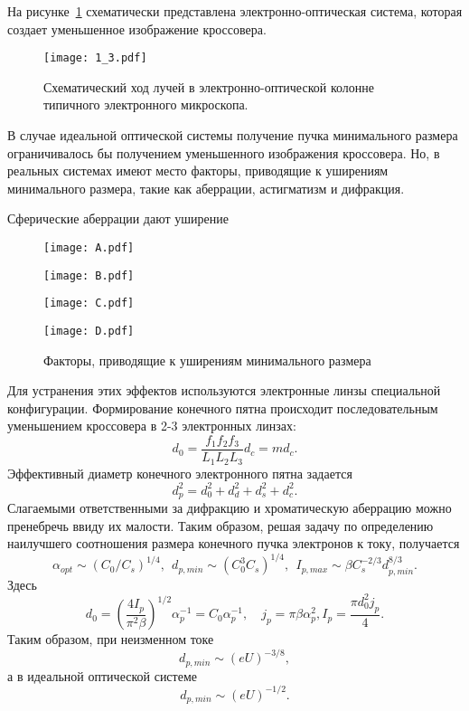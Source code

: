 На рисунке~\ref{fig:3} схематически представлена электронно-оптическая система, которая создает уменьшенное изображение кроссовера.
\begin{figure}[H]
\center
\texttt{[image: 1\_3.pdf]}
\caption{Схематический ход лучей в электронно-оптической колонне типичного электронного микроскопа.}
\label{fig:3}
\end{figure}

В случае идеальной оптической системы получение пучка минимального размера ограничивалось бы получением уменьшенного изображения кроссовера. Но, в реальных системах имеют место факторы, приводящие к уширениям минимального размера, такие как аберрации, астигматизм и дифракция.

Сферические аберрации дают уширение

\begin{figure}
    \center
    \texttt{[image: A.pdf]}
    \parbox[t]{.95\textwidth}{}
    \texttt{[image: B.pdf]}
    \parbox[t]{.95\textwidth}{}
    \texttt{[image: C.pdf]}
    \parbox[t]{.95\textwidth}{}
    \texttt{[image: D.pdf]}
    \parbox[t]{.95\textwidth}{}
    \caption{Факторы, приводящие к уширениям минимального размера}
\end{figure}

Для устранения этих эффектов используются электронные линзы специальной конфигурации.
Формирование конечного пятна происходит последовательным уменьшением кроссовера в 2-3 электронных линзах:
\begin{equation}
d_0= \frac{f_1 f_2 f_3}{L_1 L_2 L_3} d_c = md_c.
\label{eq:A4}
\end{equation}
Эффективный диаметр конечного электронного пятна задается
\begin{equation}
d_p^2=d_0^2+d_d^2+d_s^2+d_c^2.
\label{eq:A5}
\end{equation}
Слагаемыми ответственными за дифракцию и хроматическую аберрацию можно пренебречь ввиду их малости. Таким образом, решая задачу по определению наилучшего соотношения размера конечного пучка электронов к току, получается
\begin{equation}
\alpha_{opt}\sim\left(C_0/C_s\right)^{1/4},\>\>d_{p,min}\sim\left(C_0^3 C_s\right)^{1/4},\>\> I_{p,max}\sim \beta C_s^{-2/3} d_{p,min}^{8/3}.\label{eq:A6}
\end{equation}
Здесь
\[
    d_0= \left(\frac{4I_p}{\pi^2 \beta}\right)^{1/2}\alpha_p^{-1}=C_0\alpha_p^{-1},
    \quad j_p=\pi \beta \alpha_p^2 , I_p= \frac{\pi d_0^2 j_p}{4}.
\]
Таким образом, при неизменном токе
\begin{equation}
d_{p,min}\sim (eU)^{-3/8},
\label{eq:A7}
\end{equation}
а в идеальной оптической системе
\begin{equation}
d_{p,min}\sim(eU)^{-1/2}.
\end{equation}


